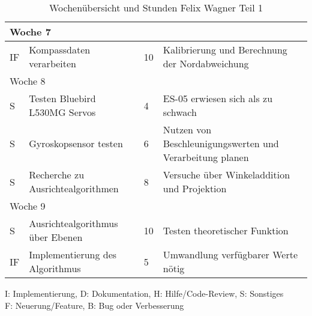\begin{table}[!hp]
\begin{center}
\begin{tabular}{|l|p{4.5cm}|p{1cm}|p{9cm}|}
        \multicolumn{4}{|l|}{Woche 7}                                                                       \\ \hline
        IF           & Kompassdaten verarbeiten & 10 & Kalibrierung und Berechnung der Nordabweichung       \\ \hline
        \multicolumn{4}{|l|}{Woche 8}                                                                       \\ \hline
        S           & Testen Bluebird L530MG Servos & 4 & ES-05 erwiesen sich als zu schwach                \\ \hline
        S           & Gyroskopsensor testen & 6 & Nutzen von Beschleunigungswerten und Verarbeitung planen \\ \hline
        S           & Recherche zu Ausrichtealgorithmen & 8 & Versuche über Winkeladdition und Projektion   \\\hline
        \multicolumn{4}{|l|}{Woche 9}                                                                       \\ \hline
        S           & Ausrichtealgorithmus über Ebenen & 10 & Testen theoretischer Funktion                   \\ \hline
        IF          & Implementierung des Algorithmus & 5 & Umwandlung verfügbarer Werte nötig              \\ \hline
    \end{tabular}
    \caption{Wochenübersicht und Stunden Felix Wagner Teil 1}
    	\label{tab:overviewFelix}
    	\end{center}
        I: Implementierung, D: Dokumentation, H: Hilfe/Code-Review, S: Sonstiges\\
        F: Neuerung/Feature, B: Bug oder Verbesserung\\
\end{table}
\vspace{1em}

